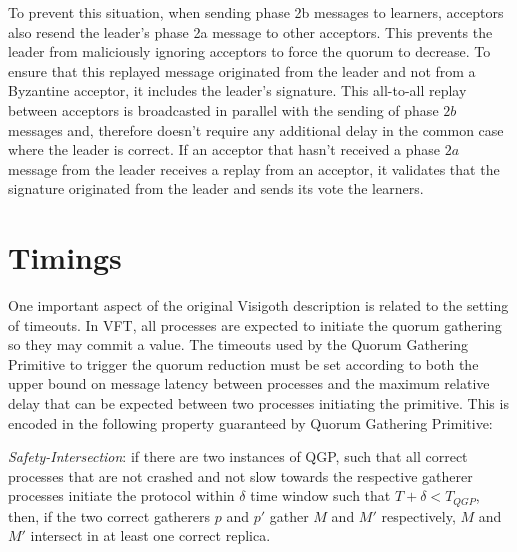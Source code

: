 To prevent this situation, when sending phase 2b messages to learners, acceptors also resend the leader's phase 2a message to other acceptors. This prevents the leader from maliciously ignoring acceptors to force the quorum to decrease. To ensure that this replayed message originated from the leader and not from a Byzantine acceptor, it includes the leader's signature. This all-to-all replay between acceptors is broadcasted in parallel with the sending of phase $2b$ messages and, therefore doesn't require any additional delay in the common case where the leader is correct. If an acceptor that hasn't received a phase $2a$ message from the leader receives a replay from an acceptor, it validates that the signature originated from the leader and sends its vote the learners.

\section{Timings}

One important aspect of the original Visigoth description is related to the setting of timeouts. In VFT, all processes are expected to initiate the quorum gathering so they may commit a value. The timeouts used by the Quorum Gathering Primitive to trigger the quorum reduction must be set according to both the upper bound on message latency between processes and the maximum relative delay that can be expected between two processes initiating the primitive. This is encoded in the following property guaranteed by Quorum Gathering Primitive: \par

\begin{displayquote}
\textit{Safety-Intersection}: if there are two instances of QGP, such that all correct processes that are not crashed and not slow towards the respective gatherer processes initiate the protocol within $\delta$ time window such that $T+\delta < T_{QGP}$, then, if the two correct gatherers $p$ and $p'$ gather $M$ and $M'$ respectively, $M$ and $M'$ intersect in at least one correct replica.
\end{displayquote}


